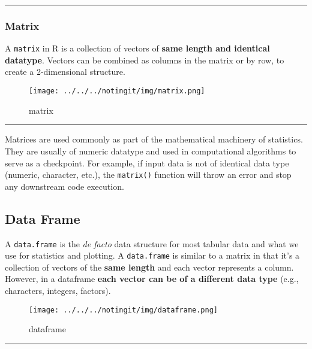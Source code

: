 \documentclass[
]{article}
\begin{document}
\begin{center}\rule{0.5\linewidth}{0.5pt}\end{center}

\hypertarget{matrix}{%
\subsubsection{Matrix}\label{matrix}}

A \texttt{matrix} in R is a collection of vectors of \textbf{same length
and identical datatype}. Vectors can be combined as columns in the
matrix or by row, to create a 2-dimensional structure.

\begin{figure}
\centering
\texttt{[image: ../../../notingit/img/matrix.png]}
\caption{matrix}
\end{figure}

\begin{center}\rule{0.5\linewidth}{0.5pt}\end{center}

Matrices are used commonly as part of the mathematical machinery of
statistics. They are usually of numeric datatype and used in
computational algorithms to serve as a checkpoint. For example, if input
data is not of identical data type (numeric, character, etc.), the
\texttt{matrix()} function will throw an error and stop any downstream
code execution.

\hypertarget{data-frame}{%
\subsection{Data Frame}\label{data-frame}}

A \texttt{data.frame} is the \emph{de facto} data structure for most
tabular data and what we use for statistics and plotting. A
\texttt{data.frame} is similar to a matrix in that it's a collection of
vectors of the \textbf{same length} and each vector represents a column.
However, in a dataframe \textbf{each vector can be of a different data
type} (e.g., characters, integers, factors).

\begin{figure}
\centering
\texttt{[image: ../../../notingit/img/dataframe.png]}
\caption{dataframe}
\end{figure}

\begin{center}\rule{0.5\linewidth}{0.5pt}\end{center}
\end{document}

